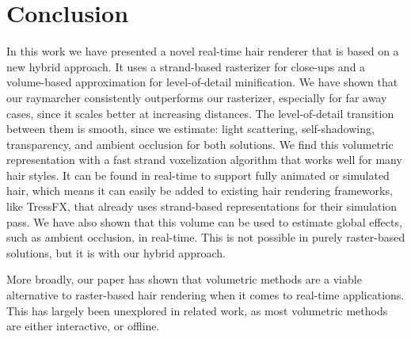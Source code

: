 \documentclass{egpubl}
\begin{document}
\section{Conclusion} \label{sec:conclusion}


In this work we have presented a novel real-time hair renderer that is based on a new hybrid approach. It uses a strand-based rasterizer for close-ups and a volume-based approximation for level-of-detail minification. We have shown that our raymarcher consistently outperforms our rasterizer, especially for far away cases, since it scales better at increasing distances. The level-of-detail transition between them is smooth, since we estimate: light scattering, self-shadowing, transparency, and ambient occlusion for both solutions. We find this volumetric representation with a fast strand voxelization algorithm that works well for many hair styles. It can be found in real-time to support fully animated or simulated hair, which means it can easily be added to existing hair rendering frameworks, like TressFX, that already uses strand-based representations for their simulation pass. We have also shown that this volume can be used to estimate global effects, such as ambient occlusion, in real-time. This is not possible in purely raster-based solutions, but it is with our hybrid approach.


More broadly, our paper has shown that volumetric methods are a viable alternative to raster-based hair rendering when it comes to real-time applications. This has largely been unexplored in related work, as most volumetric methods are either interactive, or offline.

\end{document}
